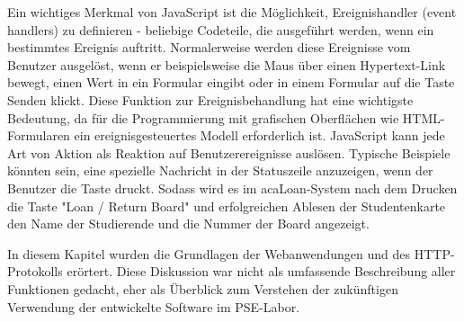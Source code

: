Ein wichtiges Merkmal von JavaScript ist die Möglichkeit, Ereignishandler (event handlers) zu definieren - beliebige Codeteile, die ausgeführt werden, wenn ein bestimmtes Ereignis auftritt. Normalerweise werden diese Ereignisse vom Benutzer ausgelöst, wenn er beispielsweise die Maus über einen Hypertext-Link bewegt, einen Wert in ein Formular eingibt oder in einem Formular auf die Taste Senden klickt. Diese Funktion zur Ereignisbehandlung hat eine wichtigste Bedeutung, da für die Programmierung mit grafischen Oberflächen wie HTML-Formularen ein ereignisgesteuertes Modell erforderlich ist. JavaScript kann jede Art von Aktion als Reaktion auf Benutzerereignisse auslösen. Typische Beispiele könnten sein, eine spezielle Nachricht in der Statuszeile anzuzeigen, wenn der Benutzer die Taste druckt. Sodass wird es im acaLoan-System nach dem Drucken die Taste "Loan / Return Board" und erfolgreichen Ablesen der Studentenkarte den Name der Studierende und die Nummer der Board angezeigt.

In diesem Kapitel wurden die Grundlagen der Webanwendungen und des HTTP-Protokolls erörtert. Diese Diskussion war nicht als umfassende Beschreibung aller Funktionen gedacht, eher als Überblick zum Verstehen der zukünftigen Verwendung der entwickelte Software im PSE-Labor. 
